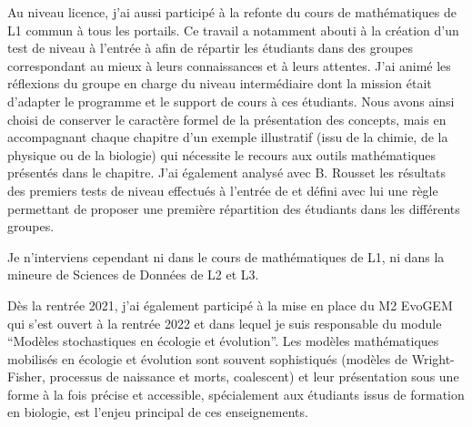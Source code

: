 Au niveau licence, j’ai aussi participé à la refonte du cours de mathématiques de L1 commun à tous les portails. Ce travail a notamment abouti à la création d’un test de niveau à l’entrée à \SU afin de répartir les étudiants dans des groupes correspondant au mieux à leurs connaissances et à leurs attentes. J’ai animé les réflexions du groupe en charge du niveau intermédiaire dont la mission était d’adapter le programme et le support de cours à ces étudiants. Nous avons ainsi choisi de conserver le caractère formel de la présentation des concepts, mais en accompagnant chaque chapitre d’un exemple illustratif (issu de la chimie, de la physique ou de la biologie) qui nécessite le recours aux outils mathématiques présentés dans le chapitre. J’ai également analysé avec B. Rousset les résultats des premiers tests de niveau effectués à l’entrée de \SU et défini avec lui une règle permettant de proposer une première répartition des étudiants dans les différents groupes.

Je n’interviens cependant ni dans le cours de mathématiques de L1, ni dans la mineure de Sciences de Données de L2 et L3.


Dès la rentrée 2021, j'ai également participé à la mise en place du M2 EvoGEM qui s'est ouvert à la rentrée 2022 et dans lequel je suis responsable du module “Modèles stochastiques en écologie et évolution”. Les modèles mathématiques mobilisés en écologie et évolution sont souvent sophistiqués (modèles de Wright-Fisher, processus de naissance et morts, coalescent) et leur présentation sous une forme à la fois précise et accessible, spécialement aux étudiants issus de formation en biologie, est l’enjeu principal de ces enseignements.

